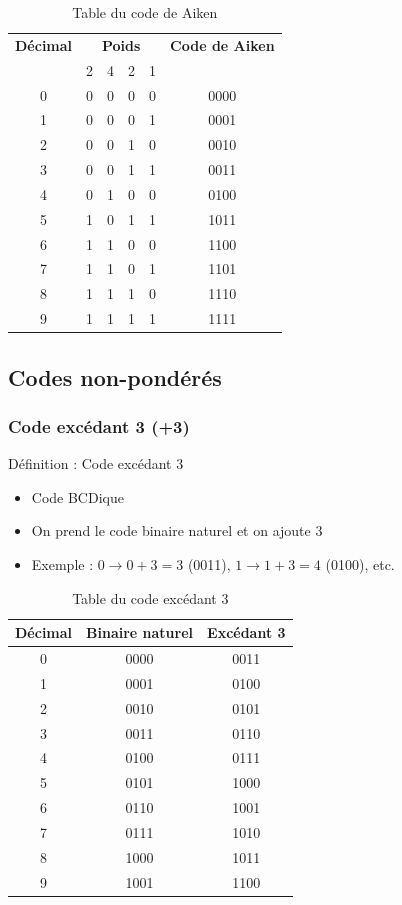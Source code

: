 \documentclass[a4paper,12pt]{article}
\begin{document}
\begin{table}[h]
\centering
\begin{tabular}{c|cccc|c}
\toprule
\textbf{Décimal} & \multicolumn{4}{c|}{\textbf{Poids}} & \textbf{Code de Aiken} \\
 & 2 & 4 & 2 & 1 & \\
\midrule
0 & 0 & 0 & 0 & 0 & 0000 \\
1 & 0 & 0 & 0 & 1 & 0001 \\
2 & 0 & 0 & 1 & 0 & 0010 \\
3 & 0 & 0 & 1 & 1 & 0011 \\
4 & 0 & 1 & 0 & 0 & 0100 \\
5 & 1 & 0 & 1 & 1 & 1011 \\
6 & 1 & 1 & 0 & 0 & 1100 \\
7 & 1 & 1 & 0 & 1 & 1101 \\
8 & 1 & 1 & 1 & 0 & 1110 \\
9 & 1 & 1 & 1 & 1 & 1111 \\
\bottomrule
\end{tabular}
\caption{Table du code de Aiken}
\end{table}

\subsection{Codes non-pondérés}

\subsubsection{Code excédant 3 (+3)}

\begin{defbox}{Définition : Code excédant 3}
\begin{itemize}
    \item Code BCDique
    \item On prend le code binaire naturel et on ajoute 3
    \item Exemple : $0 \rightarrow 0+3 = 3$ (0011), $1 \rightarrow 1+3 = 4$ (0100), etc.
\end{itemize}
\end{defbox}

\begin{table}[h]
\centering
\begin{tabular}{c|c|c}
\toprule
\textbf{Décimal} & \textbf{Binaire naturel} & \textbf{Excédant 3} \\
\midrule
0 & 0000 & 0011 \\
1 & 0001 & 0100 \\
2 & 0010 & 0101 \\
3 & 0011 & 0110 \\
4 & 0100 & 0111 \\
5 & 0101 & 1000 \\
6 & 0110 & 1001 \\
7 & 0111 & 1010 \\
8 & 1000 & 1011 \\
9 & 1001 & 1100 \\
\bottomrule
\end{tabular}
\caption{Table du code excédant 3}
\end{table}
\end{document}
